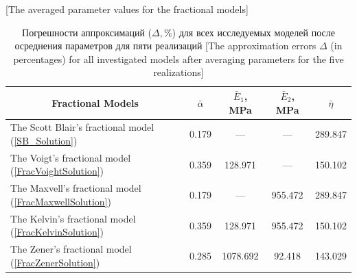 \begin{table}[t!]

\small \centering

\caption{Усредненные значения параметров для дробных моделей \label{un:tabl2}} \vspace{-3mm}
[The averaged parameter values for the fractional models] 
\renewcommand{\tabcolsep}{0.3cm}
\begin{tabular}{l||c|c|c|c} %
\hline
\multicolumn{1}{c||}{\footnotesize Fractional Models} & \footnotesize  $\bar{\alpha}$ & \footnotesize  $\bar{E}_{1}$, MPa & \footnotesize  $\bar{E}_{2}$, MPa & \footnotesize  $\bar{\eta}$\rule{0mm}{11pt}\\
            \hline
            \rule{0mm}{12pt}%
           The Scott Blair's fractional model (\ref{SB_Solution}) & 0.179  &  ---  &  ---  & 289.847   \\
           The Voigt's fractional model  (\ref{FracVoightSolution}) & 0.359  & \phantom{1}128.971 & --- &  150.102 \\
           The Maxvell's fractional model  (\ref{FracMaxwellSolution})  & 0.179 &  ---  & 955.472 & 289.847 \\
           The Kelvin's fractional  model (\ref{FracKelvinSolution}) & 0.359 & \phantom{1}128.971 & 955.472 & 150.102 \\
           The Zener's fractional  model  (\ref{FracZenerSolution}) & 0.285 & 1078.692 & \phantom{1}92.418 & 143.029 \\
            \hline
        \end{tabular}

\bigskip

\caption{Погрешности аппроксимаций ($\Delta, \%$) для всех исследуемых моделей после осреднения параметров для пяти реализаций
[The approximation errors $\Delta$ (in percentages) for all investigated models after averaging parameters for the five realizations] \label{un:tabl3}} 


\end{table}
